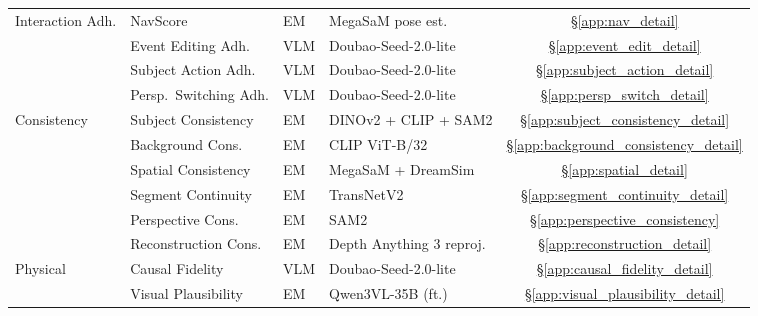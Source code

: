 \begin{table}[H]
\begin{tabular}{@{}l l l l c@{}}
\midrule
\multirow{4}{*}{Interaction Adh.}
  & NavScore             & EM  & MegaSaM pose est.     & \hyperref[app:nav_detail]{\S\ref*{app:nav_detail}} \\
  & Event Editing Adh.   & VLM & Doubao-Seed-2.0-lite  & \hyperref[app:event_edit_detail]{\S\ref*{app:event_edit_detail}} \\
  & Subject Action Adh.  & VLM & Doubao-Seed-2.0-lite  & \hyperref[app:subject_action_detail]{\S\ref*{app:subject_action_detail}} \\
  & Persp.\ Switching Adh.  & VLM & Doubao-Seed-2.0-lite  & \hyperref[app:persp_switch_detail]{\S\ref*{app:persp_switch_detail}} \\
\midrule
\multirow{6}{*}{Consistency}
  & Subject Consistency  & EM  & DINOv2 + CLIP + SAM2  & \hyperref[app:subject_consistency_detail]{\S\ref*{app:subject_consistency_detail}} \\
  & Background Cons.     & EM  & CLIP ViT-B/32         & \hyperref[app:background_consistency_detail]{\S\ref*{app:background_consistency_detail}} \\
  & Spatial Consistency  & EM  & MegaSaM + DreamSim    & \hyperref[app:spatial_detail]{\S\ref*{app:spatial_detail}} \\
  & Segment Continuity   & EM  & TransNetV2            & \hyperref[app:segment_continuity_detail]{\S\ref*{app:segment_continuity_detail}} \\
  & Perspective Cons.    & EM  & SAM2   & \hyperref[app:perspective_consistency]{\S\ref*{app:perspective_consistency}} \\
  & Reconstruction Cons. & EM  & Depth Anything 3 reproj. & \hyperref[app:reconstruction_detail]{\S\ref*{app:reconstruction_detail}} \\
\midrule
\multirow{2}{*}{Physical}
  & Causal Fidelity     & VLM & Doubao-Seed-2.0-lite  & \hyperref[app:causal_fidelity_detail]{\S\ref*{app:causal_fidelity_detail}} \\
  & Visual Plausibility & EM & Qwen3VL-35B (ft.)     & \hyperref[app:visual_plausibility_detail]{\S\ref*{app:visual_plausibility_detail}} \\
\bottomrule
\end{tabular}
\end{table}

